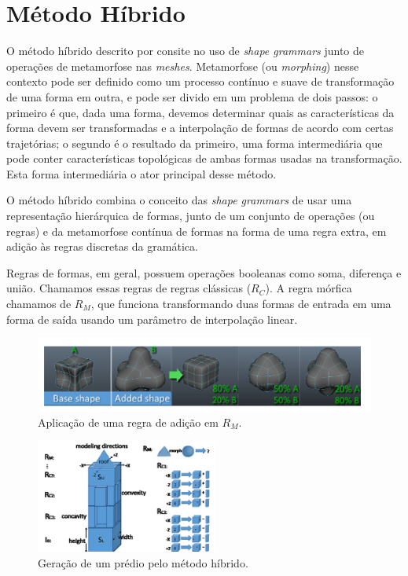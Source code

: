 \documentclass[a4paper, 11pt]{article}
\begin{document}
    \section{Método Híbrido} \label{sec:hybrid}
    O método híbrido descrito por \cite{Zawadzki:2013:GSTF} consite no uso de \textit{shape grammars} junto de operações de metamorfose nas \textit{meshes}. Metamorfose (ou \textit{morphing}) nesse contexto pode ser definido como um processo contínuo e suave de transformação de uma forma em outra, e pode ser divido em um problema de dois passos: o primeiro é que, dada uma forma, devemos determinar quais as características da forma devem ser transformadas e a interpolação de formas de acordo com certas trajetórias; o segundo é o resultado da primeiro, uma forma intermediária que pode conter características topológicas de ambas formas usadas na transformação. Esta forma intermediária o ator principal desse método.

    O método híbrido combina o conceito das \textit{shape grammars} de usar uma representação hierárquica de formas, junto de um conjunto de operações (ou regras) e da metamorfose contínua de formas na forma de uma regra extra, em adição às regras discretas da gramática.

    Regras de formas, em geral, possuem operações booleanas como soma, diferença e união. Chamamos essas regras de regras clássicas ($R_C$). A regra mórfica chamamos de $R_M$, que funciona transformando duas formas de entrada em uma forma de saída usando um parâmetro de interpolação linear.

    \begin{figure}[h]
        \centering
        \includegraphics[width=\textwidth]{imgs/morph.png}
        \caption{Aplicação de uma regra de adição em $R_M$.}
        \label{fig:morph}
    \end{figure}  

    \begin{figure}[!ht]
        \centering
        \includegraphics[width=60mm]{imgs/hybridbuilding.png}
        \caption{Geração de um prédio pelo método híbrido.}
        \label{fig:hybridblock}
    \end{figure}      
\end{document}
